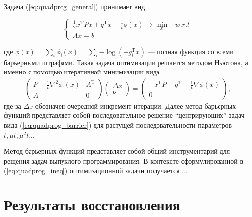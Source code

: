 Задача (\ref{eq:quadprog_general}) принимает вид

\begin{equation}
  \label{eq:quadprog_barrier}
  \begin{cases}
  \frac 1 2 x^\mathrm{T}Px + q^\mathrm{T}x + \frac 1 t \phi(x) \rightarrow \min\limits_x & w.r.t \\
  Ax = b\,
  \end{cases}
\end{equation}

где $\phi(x) = \sum_i \phi_i (x) = \sum_i {-\log{\left(- g_i^\mathrm{T}x \right)}}$ --- полная функция со всеми барьерными штрафами. 
Такая задача оптимизации решается методом Ньютона, а именно с помощью итеративной минимизации вида
\begin{gather}
\left(
  \begin{matrix}
  P + \frac 1 t \nabla^2 \phi_i(x) & A ^\mathrm{T} \\
  A & 0
  \end{matrix}
  \right)
  \left(
  \begin{matrix}
  \Delta x \\ \nu
  \end{matrix}
  \right)
  =
  \left(
  \begin{matrix}
  -x^\mathrm{T}P - q^\mathrm{T} - \frac 1 t \nabla \phi(x) \\ 0
  \end{matrix}
  \right),
\end{gather}
где за $\Delta x$ обозначен очередной инкремент итерации.
Далее метод барьерных функций представляет собой последовательное решение ``центрирующих'' задач вида (\ref{eq:quadprog_barrier}) для растущей последовательности параметров $t, \mu t, \mu^2 t \dots$

Метод барьерных функций представляет собой общий инструментарий для рещения задач выпуклого программирования. 
В контексте сформулированной в (\ref{eq:quadprog_ineq}) оптимизационной задачи получается ... 




\section{Результаты восстановления}

